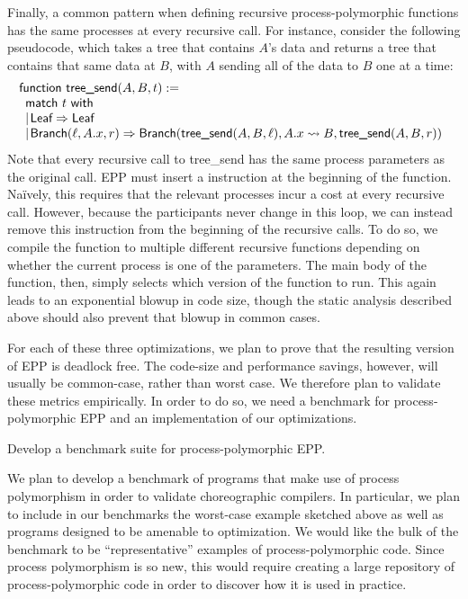 Finally, a common pattern when defining recursive process-polymorphic functions has the same processes at every recursive call.
For instance, consider the following pseudocode, which takes a tree that contains $A$'s data and returns a tree that contains that same data at $B$, with $A$ sending all of the data to $B$ one at a time:
$$
\begin{array}{l}
  \textsf{function}~\textsf{tree\_send} (A, B, t) :=\\
  \begin{array}[t]{l}
    \textsf{match}~t~\textsf{with}\\
    |\mkern2mu\textsf{Leaf} \Rightarrow \textsf{Leaf}\\
    |\mkern2mu\textsf{Branch}(\ell, A.x, r) \Rightarrow \textsf{Branch}(\textsf{tree\_send}(A, B, \ell), A.x \rightsquigarrow B, \textsf{tree\_send}(A,B,r))
  \end{array}
\end{array}
$$
Note that every recursive call to \textsf{tree\_send} has the same process parameters as the original call.
EPP must insert a \AmIName{} instruction at the beginning of the function.
Na\"ively, this requires that the relevant processes incur a cost at every recursive call.
However, because the participants never change in this loop, we can instead remove this \AmIName{} instruction from the beginning of the recursive calls.
To do so, we compile the function to multiple different recursive functions depending on whether the current process is one of the parameters.
The main body of the function, then, simply selects which version of the function to run.
This again leads to an exponential blowup in code size, though the static analysis described above should also prevent that blowup in common cases.

For each of these three optimizations, we plan to prove that the resulting version of EPP is deadlock free.
The code-size and performance savings, however, will usually be common-case, rather than worst case.
We therefore plan to validate these metrics empirically.
In order to do so, we need a benchmark for process-polymorphic EPP and an implementation of our optimizations.

\begin{goal}
  Develop a benchmark suite for process-polymorphic EPP.
\end{goal}

We plan to develop a benchmark of programs that make use of process polymorphism in order to validate choreographic compilers.
In particular, we plan to include in our benchmarks the worst-case example sketched above as well as programs designed to be amenable to optimization.
We would like the bulk of the benchmark to be ``representative'' examples of process-polymorphic code.
Since process polymorphism is so new, this would require creating a large repository of process-polymorphic code in order to discover how it is used in practice.

